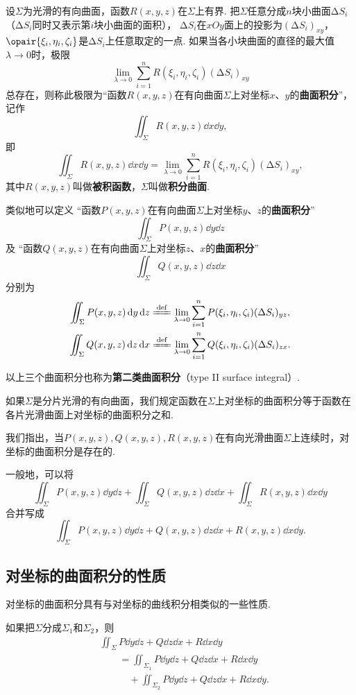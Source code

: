 \begin{definition}
设\(\Sigma\)为光滑的有向曲面，函数\(R(x,y,z)\)在\(\Sigma\)上有界.
把\(\Sigma\)任意分成\(n\)块小曲面\(\increment S_i\)%
（\(\increment S_i\)同时又表示第\(i\)块小曲面的面积），%
\(\increment S_i\)在\(xOy\)面上的投影为\((\increment S_i)_{xy}\)，%
\(\opair{\xi_i,\eta_i,\zeta_i}\)是\(\increment S_i\)上任意取定的一点.
如果当各小块曲面的直径的最大值\(\lambda\to0\)时，极限\[
\lim\limits_{\lambda\to0} \sum\limits_{i=1}^n R(\xi_i,\eta_i,\zeta_i) (\increment S_i)_{xy}
\]总存在，则称此极限为“函数\(R(x,y,z)\)在有向曲面\(\Sigma\)上对坐标\(x\)、\(y\)的\textbf{曲面积分}”，%
记作\[\iint_{\Sigma} R(x,y,z) \dd{x}\dd{y},\]即\[
\iint_{\Sigma} R(x,y,z) \dd{x}\dd{y}
=\lim\limits_{\lambda\to0} \sum\limits_{i=1}^n R(\xi_i,\eta_i,\zeta_i) (\increment S_i)_{xy},
\]其中\(R(x,y,z)\)叫做\textbf{被积函数}，\(\Sigma\)叫做\textbf{积分曲面}.

类似地可以定义%
“函数\(P(x,y,z)\)在有向曲面\(\Sigma\)上对坐标\(y\)、\(z\)的\textbf{曲面积分}”\[\iint_{\Sigma} P(x,y,z) \dd{y}\dd{z}\]
及%
“函数\(Q(x,y,z)\)在有向曲面\(\Sigma\)上对坐标\(z\)、\(x\)的\textbf{曲面积分}”\[\iint_{\Sigma} Q(x,y,z) \dd{z}\dd{x}\]
分别为
\begin{gather*}
\iint_{\Sigma} P(x,y,z) \dd{y}\dd{z}
	\defeq \lim\limits_{\lambda\to0} \sum\limits_{i=1}^n P(\xi_i,\eta_i,\zeta_i) (\increment S_i)_{yz}, \\
\iint_{\Sigma} Q(x,y,z) \dd{z}\dd{x}
	\defeq \lim\limits_{\lambda\to0} \sum\limits_{i=1}^n Q(\xi_i,\eta_i,\zeta_i) (\increment S_i)_{zx}.
\end{gather*}

以上三个曲面积分也称为\textbf{第二类曲面积分}（type II surface integral）.

如果\(\Sigma\)是分片光滑的有向曲面，我们规定函数在\(\Sigma\)上对坐标的曲面积分等于函数在各片光滑曲面上对坐标的曲面积分之和.
\end{definition}

我们指出，当\(P(x,y,z),Q(x,y,z),R(x,y,z)\)在有向光滑曲面\(\Sigma\)上连续时，对坐标的曲面积分是存在的.

一般地，可以将\[
\iint_{\Sigma} P(x,y,z) \dd{y}\dd{z}
+\iint_{\Sigma} Q(x,y,z) \dd{z}\dd{x}
+\iint_{\Sigma} R(x,y,z) \dd{x}\dd{y}
\]合并写成\[
\iint_{\Sigma}{P(x,y,z)\dd{y}\dd{z}+Q(x,y,z)\dd{z}\dd{x}+R(x,y,z)\dd{x}\dd{y}}.
\]

\subsection{对坐标的曲面积分的性质}
对坐标的曲面积分具有与对坐标的曲线积分相类似的一些性质.
\begin{property}
如果把\(\Sigma\)分成\(\Sigma_1\)和\(\Sigma_2\)，则\begin{align*}
&\iint_{\Sigma}{P\dd{y}\dd{z}+Q\dd{z}\dd{x}+R\dd{x}\dd{y}} \\
&\qquad=\iint_{\Sigma_1}{P\dd{y}\dd{z}+Q\dd{z}\dd{x}+R\dd{x}\dd{y}} \\
&\qquad\quad+\iint_{\Sigma_2}{P\dd{y}\dd{z}+Q\dd{z}\dd{x}+R\dd{x}\dd{y}}.
\end{align*}
\end{property}


